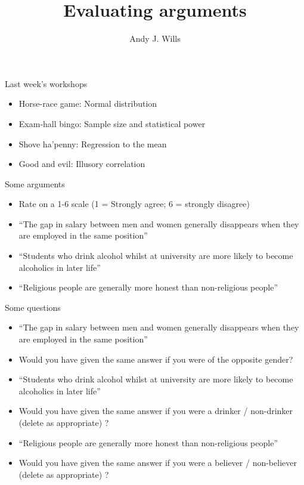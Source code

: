 \documentclass{beamer}
\title[Critical Thinking]{Evaluating arguments}
\author{Andy J. Wills}
\date{}
\begin{document}
\frame{\titlepage}

\begin{frame}{Last week's workshops}
  \begin{itemize}
  \item Horse-race game: Normal distribution
  \item Exam-hall bingo: Sample size and statistical power
  \item Shove ha'penny: Regression to the mean
  \item Good and evil: Illusory correlation
  \end{itemize}
\end{frame}

\begin{frame}{Some arguments}
\begin{itemize}
\item Rate on a 1-6 scale (1 = Strongly agree; 6 = strongly disagree)
\item ``The gap in salary between men and women generally disappears when they are employed in the same position''
\item ``Students who drink alcohol whilst at university are more likely to become alcoholics in later life''
\item ``Religious people are generally more honest than non-religious people''
\end{itemize}
\end{frame}

\begin{frame}{Some questions}
\begin{itemize}
\item ``The gap in salary between men and women generally disappears when they are employed in the same position''
\item Would you have given the same answer if you were of the opposite gender?
\item ``Students who drink alcohol whilst at university are more likely to become alcoholics in later life''
\item Would you have given the same answer if you were a drinker / non-drinker (delete as appropriate) ?
\item ``Religious people are generally more honest than non-religious people''
\item Would you have given the same answer if you were a believer / non-believer (delete as appropriate) ?
\end{itemize}
\end{frame}
\end{document}
